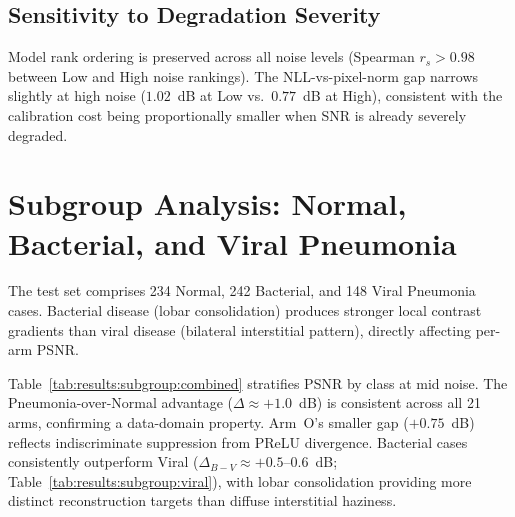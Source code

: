 \documentclass[12pt, a4paper, twoside, openright]{book}
\begin{document}
\subsection{Sensitivity to Degradation Severity}
\label{sec:results:sensitivity:dose}
Model rank ordering is preserved across all noise levels (Spearman $r_s>0.98$ between Low and High noise rankings). The NLL-vs-pixel-norm gap narrows slightly at high noise ($1.02$~dB at Low vs.\ $0.77$~dB at High), consistent with the calibration cost being proportionally smaller when SNR is already severely degraded.

\section{Subgroup Analysis: Normal, Bacterial, and Viral Pneumonia}
\label{sec:results:subgroup}

The test set comprises 234 Normal, 242 Bacterial, and 148 Viral Pneumonia cases. Bacterial disease (lobar consolidation) produces stronger local contrast gradients than viral disease (bilateral interstitial pattern), directly affecting per-arm PSNR.

Table~\ref{tab:results:subgroup:combined} stratifies PSNR by class at mid noise. The Pneumonia-over-Normal advantage ($\Delta\approx+1.0$~dB) is consistent across all 21 arms, confirming a data-domain property. Arm~O's smaller gap ($+0.75$~dB) reflects indiscriminate suppression from PReLU divergence. Bacterial cases consistently outperform Viral ($\Delta_{B-V}\approx+0.5$--$0.6$~dB; Table~\ref{tab:results:subgroup:viral}), with lobar consolidation providing more distinct reconstruction targets than diffuse interstitial haziness.
\end{document}
